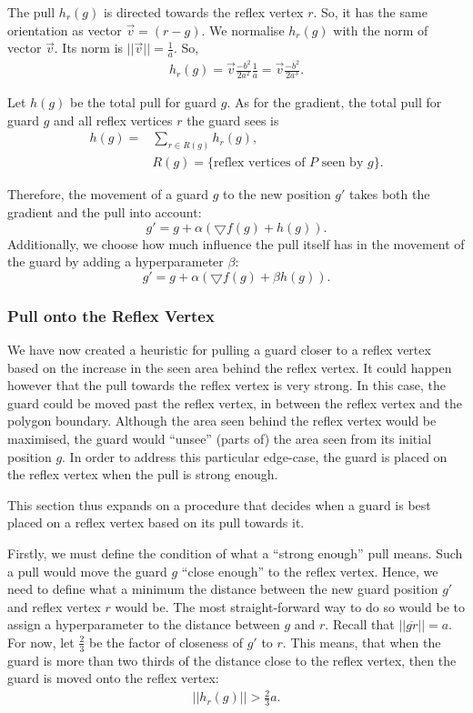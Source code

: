 The pull $h_r(g)$ is directed towards the reflex vertex $r$. So, it has the same orientation as vector $\vec{v} = (r - g)$. We  normalise $h_r(g)$ with the norm of vector $\vec{v}$. Its norm is $||\vec{v}|| = \frac 1 a$. So, 
\begin{align}
    h_r(g) = \vec{v}\frac{-b^2}{2a^2}\frac 1 a = \vec{v}\frac{-b^2}{2a^3}. \label{eq:h}
\end{align}

Let $h(g)$ be the total pull for guard $g$. As for the gradient, the total pull for guard $g$ and all reflex vertices $r$ the guard sees is 
\begin{align*}
    h(g) = &\sum_{r \in R(g)} h_r(g), \\
    &R(g) = \{\text{reflex vertices of $P$ seen by $g$\}}.
\end{align*}

Therefore, the movement of a guard $g$ to the new position $g'$ takes both the gradient and the pull into account: $$g' = g + \alpha (\bigtriangledown f(g) + h(g)).$$ Additionally, we  choose how much influence the pull itself has in the movement of the guard by adding a hyperparameter $\beta$: $$g' = g + \alpha (\bigtriangledown f(g) + \beta h(g)).$$

\subsubsection{Pull onto the Reflex Vertex}
\label{sec:pull_onto}
We have now created a heuristic for pulling a guard closer to a reflex vertex based on the increase in the seen area behind the reflex vertex. It could happen however that the pull towards the reflex vertex is very strong. In this case, the guard could be moved past the reflex vertex, in between the reflex vertex and the polygon boundary. Although the area seen behind the reflex vertex would be maximised, the guard would ``unsee'' (parts of) the area seen from its initial position $g$. In order to address this particular edge-case, the guard is placed on the reflex vertex when the pull is strong enough. 

This section thus expands on a procedure that decides when a guard is best placed on a reflex vertex based on its pull towards it.

Firstly, we must define the condition of what a ``strong enough'' pull means. Such a pull would move the guard $g$ ``close enough'' to the reflex vertex. Hence, we need to define what a minimum the distance between the new guard position $g'$ and reflex vertex $r$ would be. The most straight-forward way to do so would be to assign a hyperparameter to the distance between $g$ and $r$. Recall that $||\overline{gr}|| = a$. For now, let $\frac 2 3$ be the factor of closeness of $g'$ to $r$. This means, that when the guard is more than two thirds of the distance close to the reflex vertex, then the guard is moved onto the reflex vertex: 
\begin{align}
    ||h_r(g)|| > \frac 2 3 a. \label{eq:h_a}
\end{align}


